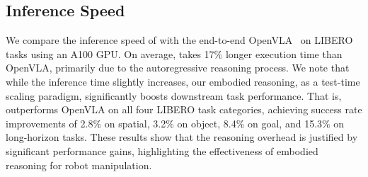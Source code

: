 \subsection{Inference Speed}
We compare the inference speed of \ours{} with the end-to-end OpenVLA~\cite{kim24openvla} on LIBERO~\cite{liu2023libero} tasks using an A100 GPU. On average, \ours{} takes 17\% longer execution time than OpenVLA, primarily due to the autoregressive reasoning process. 
We note that while the inference time slightly increases, our embodied reasoning, as a test-time scaling paradigm, significantly boosts downstream task performance.
That is, \ours{} outperforms OpenVLA on all four LIBERO task categories, achieving success rate improvements of 2.8\% on spatial, 3.2\% on object, 8.4\% on goal, and 15.3\% on long-horizon tasks. These results show that the reasoning overhead is justified by significant performance gains, highlighting the effectiveness of embodied reasoning for robot manipulation.